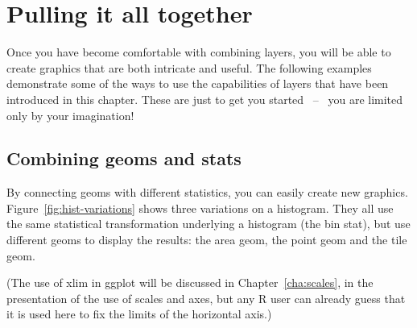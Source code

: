 \section{Pulling it all together}
\label{sec:pull-together}

Once you have become comfortable with combining layers, you will be able to create graphics that are both intricate and useful.  The following examples demonstrate some of the ways to use the capabilities of layers that have been introduced in this chapter.  These are just to get you started ~--~ you are limited only by your imagination!

\subsection{Combining geoms and stats}
\label{sub:new_plot_types}

By connecting geoms with different statistics, you can easily create new graphics.  Figure~\ref{fig:hist-variations} shows three variations on a histogram.  They all use the same statistical transformation underlying a histogram (the bin stat), but use different geoms to display the results: the area geom, the point geom and the tile geom.  

% 



(The use of xlim in ggplot will be discussed in Chapter~\ref{cha:scales}, in the presentation of the use of scales and axes, but any R user can already guess that it is used here to fix the limits of the horizontal axis.)

% 



